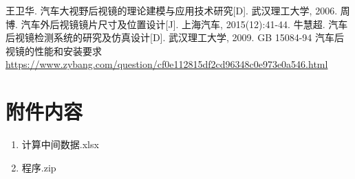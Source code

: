 \documentclass[withoutpreface,bwprint]{cumcmthesis} %
\begin{document}
\begin{thebibliography}{9}%
  王卫华. 汽车大视野后视镜的理论建模与应用技术研究[D]. 武汉理工大学, 2006.
  周博. 汽车外后视镜镜片尺寸及位置设计[J]. 上海汽车, 2015(12):41-44.
  牛慧超. 汽车后视镜检测系统的研究及仿真设计[D]. 武汉理工大学, 2009.
  GB 15084-94 汽车后视镜的性能和安装要求
 \url{https://www.zybang.com/question/cf0e112815df2cd96348c0e973e0a546.html}
 
\end{thebibliography}

\newpage
\appendix

\section{附件内容}
\begin{enumerate}
	\item 计算中间数据.xlsx
	\item 程序.zip
\end{enumerate}
\end{document}
